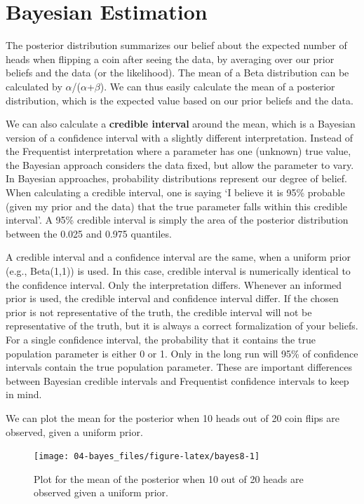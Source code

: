 \documentclass[
  oneside]{book}
\begin{document}
\hypertarget{bayesest}{%
\section{Bayesian Estimation}\label{bayesest}}

The posterior distribution summarizes our belief about the expected number of heads when flipping a coin after seeing the data, by averaging over our prior beliefs and the data (or the likelihood). The mean of a Beta distribution can be calculated by \(\alpha\)/(\(\alpha\)+\(\beta\)). We can thus easily calculate the mean of a posterior distribution, which is the expected value based on our prior beliefs and the data.

We can also calculate a \textbf{credible interval} around the mean, which is a Bayesian version of a confidence interval with a slightly different interpretation. Instead of the Frequentist interpretation where a parameter has one (unknown) true value, the Bayesian approach considers the data fixed, but allow the parameter to vary. In Bayesian approaches, probability distributions represent our degree of belief. When calculating a credible interval, one is saying `I believe it is 95\% probable (given my prior and the data) that the true parameter falls within this credible interval'. A 95\% credible interval is simply the area of the posterior distribution between the 0.025 and 0.975 quantiles.

A credible interval and a confidence interval are the same, when a uniform prior (e.g., Beta(1,1)) is used. In this case, credible interval is numerically identical to the confidence interval. Only the interpretation differs. Whenever an informed prior is used, the credible interval and confidence interval differ. If the chosen prior is not representative of the truth, the credible interval will not be representative of the truth, but it is always a correct formalization of your beliefs. For a single confidence interval, the probability that it contains the true population parameter is either 0 or 1. Only in the long run will 95\% of confidence intervals contain the true population parameter. These are important differences between Bayesian credible intervals and Frequentist confidence intervals to keep in mind.

We can plot the mean for the posterior when 10 heads out of 20 coin flips are observed, given a uniform prior.

\begin{figure}

{\centering \texttt{[image: 04-bayes\_files/figure-latex/bayes8-1]} 

}

\caption{Plot for the mean of the posterior when 10 out of 20 heads are observed given a uniform prior.}\label{fig:bayes8}
\end{figure}
\end{document}
